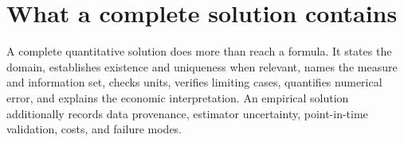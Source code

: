\section{What a complete solution contains}

A complete quantitative solution does more than reach a formula. It states the
domain, establishes existence and uniqueness when relevant, names the measure and
information set, checks units, verifies limiting cases, quantifies numerical error,
and explains the economic interpretation. An empirical solution additionally
records data provenance, estimator uncertainty, point-in-time validation, costs,
and failure modes.
